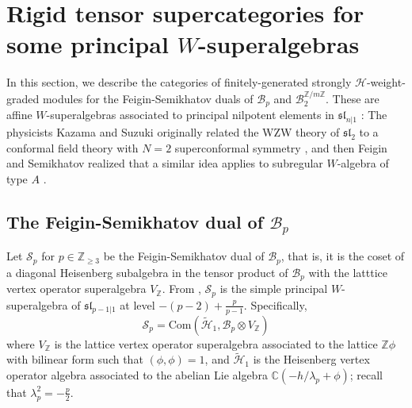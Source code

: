 \documentclass[11pt, reqno]{amsart}
\theoremstyle{definition}\newtheorem{defi}[thm]{Definition}
\theoremstyle{definition}\newtheorem{rem}[thm]{Remark}
\theoremstyle{definition}\newtheorem{exam}[thm]{Example}
\theoremstyle{definition}\newtheorem{assum}[thm]{Assumption}
\newcommand{\cB}{\mathcal{B}}
\newcommand{\cH}{\mathcal{H}}
\newcommand{\cS}{\mathcal{S}}
\newcommand{\til}{\widetilde}
\newcommand{\CC}{\mathbb{C}}
\newcommand{\ZZ}{\mathbb{Z}}
\begin{document}
 
\section{Rigid tensor supercategories for some principal \texorpdfstring{$W$}{W}-superalgebras}\label{sec:super}

In this section, we describe the categories of finitely-generated strongly $\cH$-weight-graded modules for the Feigin-Semikhatov duals of $\cB_p$ and $\cB_2^{\ZZ/m\ZZ}$. These are affine $W$-superalgebras associated to principal nilpotent elements in $\mathfrak{sl}_{n\vert 1}$ \cite{CGN}: The physicists Kazama and Suzuki originally related the WZW theory of $\mathfrak{sl}_2$ to a conformal field theory with $N=2$ superconformal symmetry \cite{KS}, and then Feigin and Semikhatov realized that a similar idea applies to subregular $W$-algebra of type $A$ \cite{FS}.


\subsection{The Feigin-Semikhatov dual of \texorpdfstring{$\cB_p$}{Bp}}


Let $\mathcal{S}_p$ for $p\in\ZZ_{\geq 3}$ be the Feigin-Semikhatov dual of $\mathcal{B}_p$, that is, it is the coset of a diagonal Heisenberg subalgebra in the tensor product of $\mathcal{B}_p$ with the latttice vertex operator superalgebra $V_\ZZ$. From \cite[Theorem~4.4(2)]{CGN},  $\cS_p$ is the simple principal $W$-superalgebra of $\mathfrak{sl}_{p-1\vert 1}$ at level $-(p-2)+\frac{p}{p-1}$. Specifically,
\begin{equation}\label{eqn:Sp_def}
\cS_p =\mathrm{Com}(\til{\cH}_1,\cB_p\otimes V_\ZZ)
\end{equation}
where $V_\ZZ$ is the lattice vertex operator superalgebra associated to the lattice $\ZZ\phi$ with bilinear form such that $(\phi,\phi)=1$, and $\til{\cH}_1$ is the Heisenberg vertex operator algebra associated to the abelian Lie algebra $\CC\left(-h/\lambda_p + \phi\right)$; recall that $\lambda_p^2=-\frac{p}{2}$.
\end{document}
